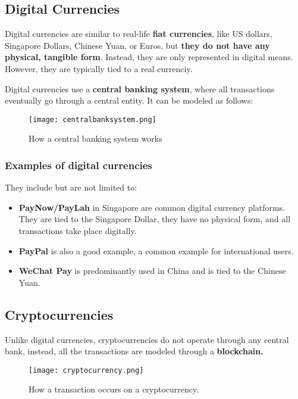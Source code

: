\documentclass[../main.tex]{subfiles}
\begin{document}
\subsection{Digital Currencies}

Digital currencies are similar to real-life \textbf{fiat currencies}, like US dollars, Singapore Dollars, Chinese Yuan, or Euros, but \textbf{they do not have any physical, tangible form}. Instead, they are only represented in digital means. However, they are typically tied to a real currenciy.

Digital currencies use a \textbf{central banking system}, where all transactions eventually go through a central entity. It can be modeled as follows:

\begin{figure}[H]
    \centering
    \texttt{[image: centralbanksystem.png]}
    \caption{How a central banking system works}
    \label{fig:centralbankingsystem}
\end{figure}

\subsubsection{Examples of digital currencies}

They include but are not limited to:

\begin{itemize}
    \item \textbf{PayNow/PayLah} in Singapore are common digital currency platforms. They are tied to the Singapore Dollar, they have no physical form, and all transactions take place digitally.
    \item \textbf{PayPal} is also a good example, a common example for international users.
    \item \textbf{WeChat Pay} is predominantly used in China and is tied to the Chinese Yuan.
\end{itemize}

\subsection{Cryptocurrencies}

Unlike digital currencies, cryptocurrencies do not operate through any central bank, instead, all the transactions are modeled through a \textbf{blockchain.}

\begin{figure}[H]
    \centering
    \texttt{[image: cryptocurrency.png]}
    \caption{How a transaction occurs on a cryptocurrency.}
    \label{fig:cryptocurrency}
\end{figure}
\end{document}
